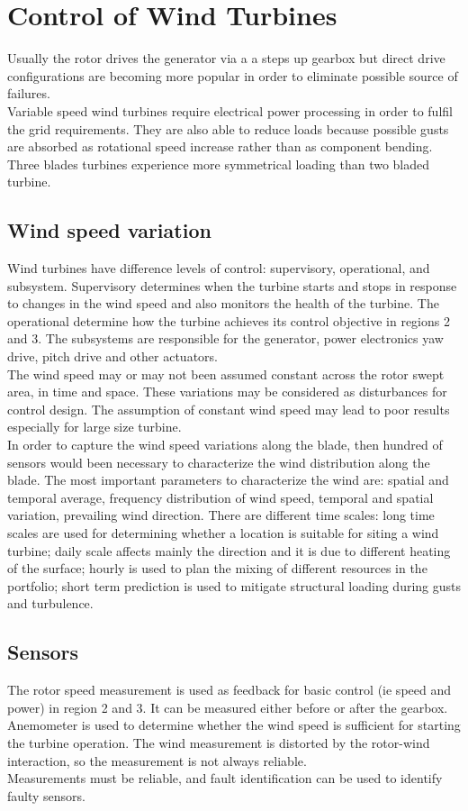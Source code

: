 \documentclass[]{article}
\begin{document}
\section{Control of Wind Turbines \cite{5160195}}
Usually the rotor drives the generator via a a steps up gearbox but direct drive configurations are becoming more popular in order to eliminate possible source of failures. \\
Variable speed wind turbines require electrical power processing in order to fulfil the grid requirements. They are also able to reduce loads because possible gusts are absorbed as rotational speed increase rather than as component bending.\\
Three blades turbines experience more symmetrical loading than two bladed turbine.  
\subsection{Wind speed variation}
Wind turbines have difference levels of control: supervisory, operational, and subsystem. Supervisory determines when the turbine starts and stops in response to changes in the wind speed and also monitors the health of the turbine. The operational determine how the turbine achieves its control objective in regions 2 and 3. The subsystems are responsible for the generator, power electronics yaw drive, pitch drive and other actuators.\\
The wind speed may or may not been assumed constant across the rotor swept area, in time and space. These variations may be considered as disturbances for control design. The assumption of constant wind speed may lead to poor results especially for large size turbine. \\
In order to capture the wind speed variations along the blade, then hundred of sensors would been necessary to characterize the wind distribution along the blade. The most important parameters to characterize the wind are: spatial and temporal average, frequency distribution of wind speed, temporal and spatial variation, prevailing wind direction. There are different time scales: long time scales are used for determining whether a location is suitable for siting a wind turbine; daily scale affects mainly the direction and it is due to different heating of the surface; hourly is used to plan the mixing of different resources in the portfolio; short term prediction is used to mitigate structural loading during gusts and turbulence. \\
\subsection{Sensors}
The rotor speed measurement is used as feedback for basic control (ie speed and power) in region 2 and 3. It can be measured either before or after the gearbox.\\ Anemometer is used to determine whether the wind speed is sufficient for starting the turbine operation. The wind measurement is distorted by the rotor-wind interaction, so the measurement is not always reliable. \\
Measurements must be reliable, and fault identification can be used to identify faulty sensors. 
\end{document}
